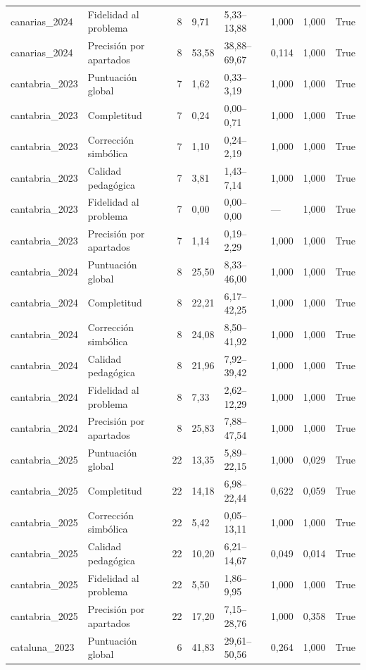 \begin{tabular}{llrllllr}
canarias\_2024 & Fidelidad al problema & 8 & 9,71 & 5,33–13,88 & 1,000 & 1,000 & True \\
canarias\_2024 & Precisión por apartados & 8 & 53,58 & 38,88–69,67 & 0,114 & 1,000 & True \\
cantabria\_2023 & Puntuación global & 7 & 1,62 & 0,33–3,19 & 1,000 & 1,000 & True \\
cantabria\_2023 & Completitud & 7 & 0,24 & 0,00–0,71 & 1,000 & 1,000 & True \\
cantabria\_2023 & Corrección simbólica & 7 & 1,10 & 0,24–2,19 & 1,000 & 1,000 & True \\
cantabria\_2023 & Calidad pedagógica & 7 & 3,81 & 1,43–7,14 & 1,000 & 1,000 & True \\
cantabria\_2023 & Fidelidad al problema & 7 & 0,00 & 0,00–0,00 & — & 1,000 & True \\
cantabria\_2023 & Precisión por apartados & 7 & 1,14 & 0,19–2,29 & 1,000 & 1,000 & True \\
cantabria\_2024 & Puntuación global & 8 & 25,50 & 8,33–46,00 & 1,000 & 1,000 & True \\
cantabria\_2024 & Completitud & 8 & 22,21 & 6,17–42,25 & 1,000 & 1,000 & True \\
cantabria\_2024 & Corrección simbólica & 8 & 24,08 & 8,50–41,92 & 1,000 & 1,000 & True \\
cantabria\_2024 & Calidad pedagógica & 8 & 21,96 & 7,92–39,42 & 1,000 & 1,000 & True \\
cantabria\_2024 & Fidelidad al problema & 8 & 7,33 & 2,62–12,29 & 1,000 & 1,000 & True \\
cantabria\_2024 & Precisión por apartados & 8 & 25,83 & 7,88–47,54 & 1,000 & 1,000 & True \\
cantabria\_2025 & Puntuación global & 22 & 13,35 & 5,89–22,15 & 1,000 & 0,029 & True \\
cantabria\_2025 & Completitud & 22 & 14,18 & 6,98–22,44 & 0,622 & 0,059 & True \\
cantabria\_2025 & Corrección simbólica & 22 & 5,42 & 0,05–13,11 & 1,000 & 1,000 & True \\
cantabria\_2025 & Calidad pedagógica & 22 & 10,20 & 6,21–14,67 & 0,049 & 0,014 & True \\
cantabria\_2025 & Fidelidad al problema & 22 & 5,50 & 1,86–9,95 & 1,000 & 1,000 & True \\
cantabria\_2025 & Precisión por apartados & 22 & 17,20 & 7,15–28,76 & 1,000 & 0,358 & True \\
cataluna\_2023 & Puntuación global & 6 & 41,83 & 29,61–50,56 & 0,264 & 1,000 & True \\

\end{tabular}
